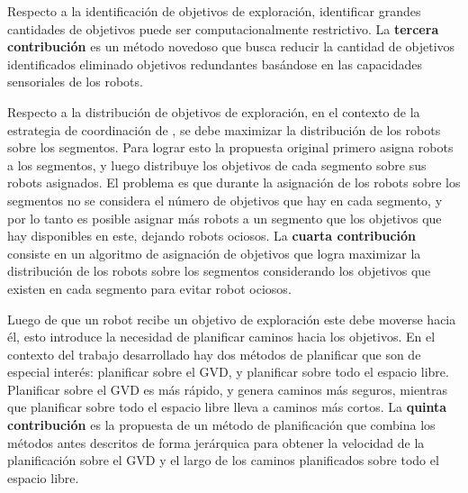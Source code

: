 Respecto a la identificación de objetivos de exploración, identificar grandes
cantidades de objetivos puede ser computacionalmente restrictivo. La
\textbf{tercera contribución} es un método novedoso que busca reducir la
cantidad de objetivos identificados eliminado objetivos redundantes basándose
en las capacidades sensoriales de los robots. 

Respecto a la distribución de objetivos de exploración, en el contexto de la
estrategia de coordinación de \cite{wurm2008coordinated}, se debe maximizar la
distribución de los robots sobre los segmentos. Para lograr esto la propuesta
original primero asigna robots a los segmentos, y luego distribuye los
objetivos de cada segmento sobre sus robots asignados. El problema es que
durante la asignación de los robots sobre los segmentos no se considera el
número de objetivos que hay en cada segmento, y por lo tanto es posible
asignar más robots a un segmento que los objetivos que hay disponibles en este,
dejando robots ociosos. La \textbf{cuarta contribución} consiste en un
algoritmo de asignación de objetivos que logra maximizar la distribución de los
robots sobre los segmentos considerando los objetivos que existen en cada
segmento para evitar robot ociosos.

Luego de que un robot recibe un objetivo de exploración este debe moverse hacia
él, esto introduce la necesidad de planificar caminos hacia los objetivos. En el
contexto del trabajo desarrollado hay dos métodos de planificar que son de
especial interés: planificar sobre el GVD, y planificar sobre todo el espacio
libre. Planificar sobre el GVD es más rápido, y genera caminos más
seguros, mientras que  planificar sobre todo el espacio libre lleva a caminos más
cortos. La \textbf{quinta contribución} es la propuesta de un método de planificación
que combina los métodos antes descritos de forma jerárquica para obtener la
velocidad de la planificación sobre el GVD y el largo de los caminos
planificados sobre todo el espacio libre.






